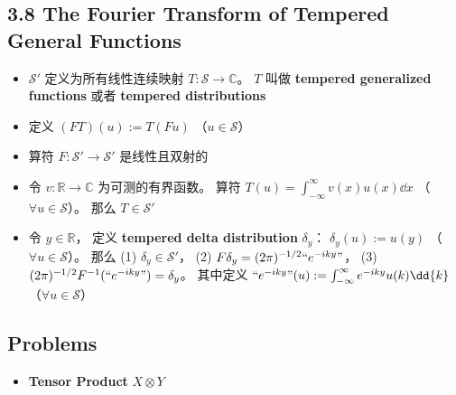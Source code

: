 \subsection{3.8 The Fourier Transform of Tempered General Functions}
\begin{itemize}
\item $\mathcal S'$ 定义为所有线性连续映射 $T: \mathcal S\to \mathbb C$。 $T$ 叫做 \textbf{tempered generalized functions} 或者 \textbf{tempered distributions}

\item 定义 $(FT)(u) := T(Fu)$ （$u \in \mathcal S$）

\item 算符 $F : \mathcal S' \to \mathcal S'$ 是线性且双射的

\item 令 $v : \mathbb R\to\mathbb C$ 为可测的有界函数。 算符 $T(u) = \int_{-\infty}^\infty v(x)u(x) \dd{x}$ （$\forall u \in \mathcal S$）。 那么 $T \in \mathcal S'$

\item 令 $y \in \mathbb R$， 定义 \textbf{tempered delta distribution} $\delta_y$： $\delta_y(u) := u(y)$ （$\forall u \in \mathcal S$）。 那么 (1) $\delta_y \in \mathcal S'$， (2) $F\delta_y = (2\pi)^{-1/2}``e^{-iky}"$， (3) $(2\pi)^{-1/2} F^{-1} (``e^{-iky}") = \delta_y$。 其中定义 $``e^{-iky}"(u) := \int_{-\infty}^\infty e^{-iky} u(k) \dd{k}$ （$\forall u\in\mathcal S$）
\end{itemize}

\subsection{Problems}
\begin{itemize}
\item \textbf{Tensor Product} $X\otimes Y$
\end{itemize}
